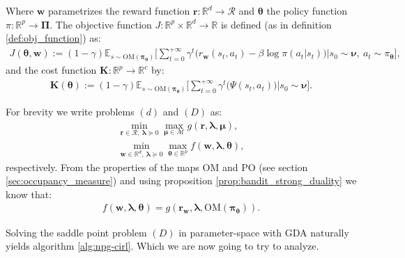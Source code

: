 Where $\bm{w}$ parametrizes the reward function $\bm{r}:\mathbb{R}^d\rightarrow \mathcal{R}$ and $\bm{\theta}$ the policy function $\pi:\mathbb{R}^p \rightarrow \bm{\Pi}$. The objective function $J:\mathbb{R}^p \times \mathbb{R}^d \rightarrow \mathbb{R}$ is defined (as in definition \ref{def:obj_function}) as:
\begin{align*}
    J(\bm{\theta},\bm{w}) := (1-\gamma) \mathbb{E}_{s \sim \text{OM}(\bm{\pi}_{\bm{\theta}})} \Big[ \sum_{t=0}^{+\infty}  \gamma^t \bigl( r_{\bm{w}}(s_t,a_t) - \beta \log \pi(a_t|s_t)\bigr) \Big| s_0 \sim \bm{\nu}, ~ a_t \sim \pi_{\bm{\theta}} \Big], 
\end{align*}
and the cost function $\bm{K}:\mathbb{R}^p \rightarrow \mathbb{R}^c$ by:
\begin{align*}
    \bm{K}(\bm{\theta}) := (1-\gamma) \mathbb{E}_{s \sim \text{OM}(\bm{\pi}_{\bm{\theta}})} \Big[ \sum_{t=0}^{+\infty}  \gamma^t \bigl( \Psi(s_t,a_t) \bigr) \Big| s_0 \sim \bm{\nu} \Big].
\end{align*}

For brevity we write problems $(d)$ and $(D)$ as:
\begin{align*}
    \min_{\bm{r}\in\mathcal{R}, ~ \bm{\lambda}\succcurlyeq 0}\max_{\bm{\mu}\in\mathcal{M}} 
    g(\bm{r},\bm{\lambda},\bm{\mu}), \tag{d} \\
    \min_{\bm{w}\in\mathbb{R}^d, ~ \bm{\lambda}\succcurlyeq 0}\max_{\bm{\theta}\in\mathbb{R}^p} 
    f(\bm{w},\bm{\lambda},\bm{\theta}), \tag{D}
\end{align*}
respectively. From the properties of the maps $\text{OM}$ and $\text{PO}$ (see section \ref{sec:occupancy_measure}) and using proposition \ref{prop:bandit_strong_duality} we know that:
\begin{align*}
    f(\bm{w},\bm{\lambda},\bm{\theta}) = g(\bm{r}_{\bm{w}},\bm{\lambda},\text{OM}(\bm{\pi}_{\bm{\theta}})).
\end{align*}


Solving the saddle point problem $(D)$ in parameter-space with GDA naturally yields algorithm \ref{alg:npg-cirl}. Which we are now going to try to analyze.

